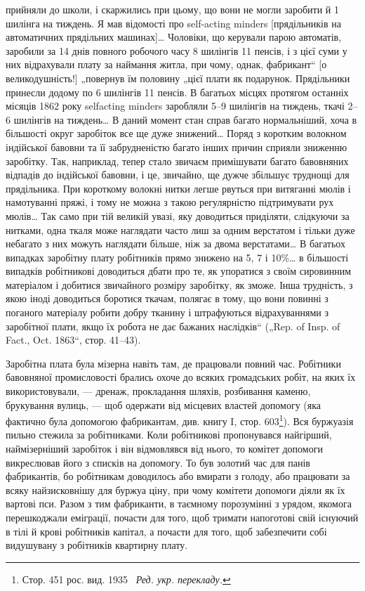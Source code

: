 \parcont{}  %
прийняли до школи, і скаржились при цьому, що вони не могли
заробити й 1 шилінга на тиждень. Я мав відомості про self-acting
minders [прядільників на автоматичних прядільних машинах]\dots{}
Чоловіки, що керували парою автоматів, заробили за 14 днів
повного робочого часу 8 шилінгів 11 пенсів, і з цієї суми у них відрахували
плату за наймання житла, при чому, однак, фабрикант“
[о великодушність!] „повернув їм половину „цієї плати як
подарунок. Прядільники принесли додому по 6 шилінгів 11 пенсів.
В багатьох місцях протягом останніх місяців 1862 року selfacting
minders заробляли 5--9 шилінгів на тиждень, ткачі 2--6 шилінгів
на тиждень\dots{} В даний момент стан справ багато нормальніший,
хоча в більшості округ заробіток все ще дуже знижений\dots{}
Поряд з коротким волокном індійської бавовни та її забрудненістю
багато інших причин сприяли зниженню заробітку. Так,
наприклад, тепер стало звичаєм примішувати багато бавовняних
відпадів до індійської бавовни, і це, звичайно, ще дужче збільшує
труднощі для прядільника. При короткому волокні нитки
легше рвуться при витяганні мюлів і намотуванні пряжі, і тому
не можна з такою регулярністю підтримувати рух мюлів\dots{} Так
само при тій великій увазі, яку доводиться приділяти, слідкуючи
за нитками, одна ткаля може наглядати часто лиш за одним верстатом
і тільки дуже небагато з них можуть наглядати більше,
ніж за двома верстатами\dots{} В багатьох випадках заробітну плату
робітників прямо знижено на 5, 7 і 10\%\dots{} в більшості випадків
робітникові доводиться дбати про те, як упоратися з своїм сировинним
матеріалом і добитися звичайного розміру заробітку, як
зможе. Інша трудність, з якою іноді доводиться боротися ткачам,
полягає в тому, що вони повинні з поганого матеріалу робити
добру тканину і штрафуються відрахуваннями з заробітної
плати, якщо їх робота не дає бажаних наслідків“ („Rep. of Insp.
of Fact., Oct. 1863“, стор. 41--43).

Заробітна плата була мізерна навіть там, де працювали повний
час. Робітники бавовняної промисловості брались охоче до всяких
громадських робіт, на яких їх використовували, — дренаж, прокладання
шляхів, розбивання каменю, брукування вулиць, — щоб
одержати від місцевих властей допомогу (яка фактично була допомогою
фабрикантам, див. книгу I, стор. 603\footnote*{Стор. 451 рос. вид. 1935~ \emph{Ред. укр. перекладу.}}). Вся буржуазія
пильно стежила за робітниками. Коли робітникові пропонувався
найгірший, наймізерніший заробіток і він відмовлявся від нього,
то комітет допомоги викреслював його з списків на допомогу. То
був золотий час для панів фабрикантів, бо робітникам доводилось
або вмирати з голоду, або працювати за всяку найзисковнішу
для буржуа ціну, при чому комітети допомоги діяли як
їх вартові пси. Разом з тим фабриканти, в таємному порозумінні
з урядом, якомога перешкоджали еміграції, почасти для
того, щоб тримати напоготові свій існуючий в тілі й крові робітників
капітал, а почасти для того, щоб забезпечити собі видушувану
з робітників квартирну плату.

